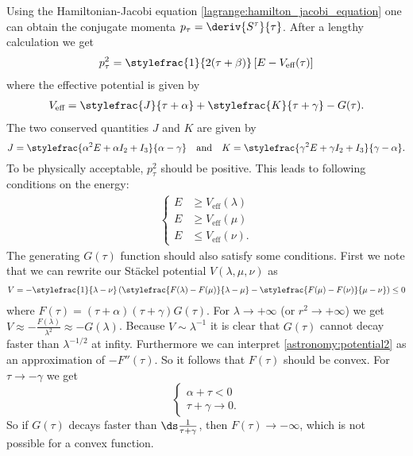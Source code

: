     Using the Hamiltonian-Jacobi equation \ref{lagrange:hamilton_jacobi_equation} one can obtain the conjugate momenta $p_\tau = \deriv{S^\tau}{\tau}$. After a lengthy calculation we get
    \begin{gather}
        p_\tau^2 = \stylefrac{1}{2(\tau + \beta)}\left[E - V_{\text{eff}}(\tau)\right]
    \end{gather}
    where the effective potential is given by
    \begin{gather}
        V_{\text{eff}} = \stylefrac{J}{\tau + \alpha} + \stylefrac{K}{\tau + \gamma} - G(\tau).
    \end{gather}
    The two conserved quantities $J$ and $K$ are given by \[J = \stylefrac{\alpha^2E + \alpha I_2 + I_3}{\alpha - \gamma} \quad\text{and}\quad K = \stylefrac{\gamma^2E + \gamma I_2 + I_3}{\gamma - \alpha}.\] To be physically acceptable, $p_\tau^2$ should be positive. This leads to following conditions on the energy:
    \begin{gather}
        \begin{cases}
            E&\geq V_{\text{eff}}(\lambda)\\
            E&\geq V_{\text{eff}}(\mu)\\
            E&\leq V_{\text{eff}}(\nu).
        \end{cases}
    \end{gather}
    The generating $G(\tau)$ function should also satisfy some conditions. First we note that we can rewrite our St\"ackel potential $V(\lambda, \mu, \nu)$ as
    \begin{gather}
        \label{astronomy:potential2}
        V = -\stylefrac{1}{\lambda - \nu}\left(\stylefrac{F(\lambda) - F(\mu)}{\lambda - \mu} - \stylefrac{F(\mu) - F(\nu)}{\mu - \nu}\right) \leq 0
    \end{gather}
    where $F(\tau) = (\tau + \alpha)(\tau + \gamma)G(\tau)$. For $\lambda\rightarrow+\infty$ (or $r^2\rightarrow+\infty$) we get $V \approx -\frac{F(\lambda)}{\lambda^2} \approx -G(\lambda)$. Because $V\sim \lambda^{-1}$ it is clear that $G(\tau)$ cannot decay faster than $\lambda^{-1/2}$ at infity. Furthermore we can interpret \ref{astronomy:potential2} as an approximation of $-F''(\tau)$. So it follows that $F(\tau)$ should be convex. For $\tau\rightarrow-\gamma$ we get \[\begin{cases}\alpha + \tau < 0\\\tau + \gamma \rightarrow 0.\end{cases}\] So if $G(\tau)$ decays faster than $\ds\frac{1}{\tau + \gamma}$, then $F(\tau)\rightarrow-\infty$, which is not possible for a convex function.

